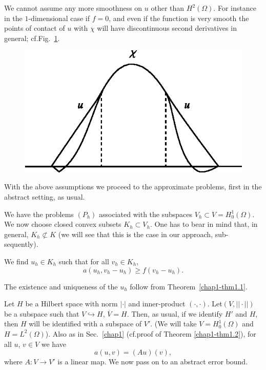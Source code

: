\begin{remark}\label{chap9-rem9.1}
We cannot assume any more smoothness on $u$ other than
$H^{2}(\Omega)$. For instance in the $1$-dimensional case if $f=0$,
and even if the function is very smooth the points of contact of $u$
with $\chi$ will have discontinuous second derivatives in general;
cf.\@ Fig.~\ref{chap9-fig9.2}.
\begin{figure}[H]
\centering
\includegraphics{figure/fig9.2.eps}
\caption{}\label{chap9-fig9.2}
\end{figure}
\end{remark}

With the above assumptions we proceed to the approximate problems,
first in the abstract setting, as usual.

We have the problems $(P_{h})$ associated with the subspaces
$V_{h}\subset V=H^{1}_{0}(\Omega)$. We now choose closed convex
subsets $K_{h}\subset V_{h}$. One has to bear in mind that, in
general, $K_{h}\not\subset K$ (we will see that this is the case in
our approach, sub-sequently).

We find $u_{h}\in K_{h}$ such that for all $v_{h}\in K_{h}$,
\begin{equation*}
a(u_{h},v_{h}-u_{h})\geq f(v_{h}-u_{h}).\tag{9.5}\label{chap9-eq9.5}
\end{equation*}

The existence and uniqueness of the $u_{h}$ follow from
Theorem~\ref{chap1-thm1.1}. 

Let $H$ be a Hilbert space with norm $|\cdot|$ and inner-product
$(\cdot,\cdot)$. Let\pageoriginale $(V,||\cdot||)$ be a subspace such
that $V\hookrightarrow H$, $\overline{V}=H$. Then, as usual, if we
identify $H'$ and $H$, then $H$ will be identified with a subspace of
$V'$. (We will take $V=H^{1}_{0}(\Omega)$ and $H=L^{2}(\Omega)$). Also
as in Sec.~\ref{chap1} (cf.\@ proof of Theorem \ref{chap1-thm1.2}),
for all $u$, $v\in V$ we have
\begin{equation*}
a(u,v)=(Au)(v),\tag{9.6}\label{chap9-eq9.6}
\end{equation*}
where $A:V\to V'$ is a linear map. We now pass on to an abstract error
bound. 

